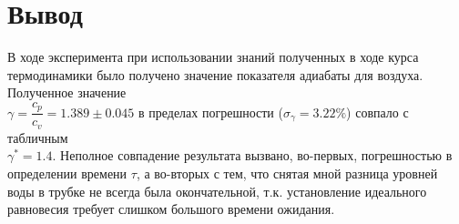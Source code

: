 \documentclass[a4paper,12pt]{article}
\begin{document}
	\section{Вывод}
	
	В ходе эксперимента при использовании знаний полученных в ходе курса термодинамики было получено значение показателя адиабаты для воздуха. Полученное значение \\
	$\gamma = \dfrac{c_p}{c_v} = 1.389 \pm 0.045$ в пределах погрешности ($\sigma_{\gamma} = 3.22\%$) совпало с табличным \\ $\gamma^* = 1.4$. Неполное совпадение результата вызвано, во-первых, погрешностью в определении времени $\tau$, а во-вторых с тем, что снятая мной разница уровней воды в трубке не всегда была окончательной, т.к. установление идеального равновесия требует слишком большого времени ожидания.
	
\end{document}
